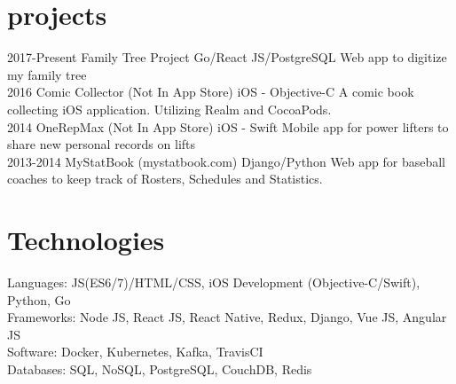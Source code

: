 \documentclass[]{friggeri-cv} %
\begin{document}

\section{projects}

\begin{entrylist}
\entry
{2017-Present}
{Family Tree Project}
{Go/React JS/PostgreSQL}
{Web app to digitize my family tree}\\

\entry
{2016}
{Comic Collector (Not In App Store)}
{iOS - Objective-C}
{A comic book collecting iOS application. Utilizing Realm and CocoaPods.}\\

\entry
{2014}
{OneRepMax (Not In App Store)}
{iOS - Swift}
{Mobile app for power lifters to share new personal records on lifts}\\

\entry
{2013-2014}
{MyStatBook (mystatbook.com)}
{Django/Python}
{Web app for baseball coaches to keep track of Rosters, Schedules and Statistics.}\\

\end{entrylist}


\section{Technologies}
{Languages: JS(ES6/7)/HTML/CSS, iOS Development (Objective-C/Swift), Python, Go} \\
{Frameworks: Node JS, React JS, React Native, Redux, Django, Vue JS, Angular JS} \\
{Software: Docker, Kubernetes, Kafka, TravisCI} \\
{Databases: SQL, NoSQL, PostgreSQL, CouchDB, Redis} \\
\end{document}
